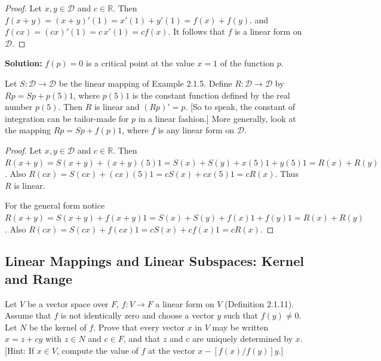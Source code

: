 \begin{proof}
    Let $x, y \in \mathcal{D}$ and $c \in \mathbb{R}$.
    Then $f(x + y) = (x + y)'(1) = x'(1) + y'(1) = f(x) + f(y)$.
    and $f(cx) = (cx)'(1) = c\, x'(1) = c f(x)$.
    It follows that $f$ is a linear form on $\mathcal{D}$.
\end{proof}

\textbf{Solution:} $f(p) = 0$ is a critical point at the value $x = 1$ of the function $p$.

\begin{tcolorbox}[title=Problem 8, breakable]
    Let $S : \mathcal{D} \longrightarrow \mathcal{D}$ be the linear mapping of Example 2.1.5.
    Define $R : \mathcal{D} \longrightarrow \mathcal{D}$ by $Rp = Sp + p(5)1$, where $p(5)1$ is the 
    constant function defined by the real number $p(5)$. Then $R$ is linear and 
    $(Rp)' = p$. [So to speak, the constant of integration can be tailor-made for $p$ in a linear fashion.]
    More generally, look at the mapping $Rp = Sp + f(p)1$, where $f$ is any linear form on $\mathcal{D}$.
\end{tcolorbox}

\begin{proof}
    Let $x, y \in \mathcal{D}$ and $c \in \mathbb{R}$.
    Then $R(x + y) = S(x + y) + (x + y)(5)1 = S(x) + S(y) + x(5)1 + y(5)1 = R(x) + R(y)$.
    Also $R(cx) = S(cx) + (cx)(5)1 = c S(x) + c x(5)1 = c R(x)$.
    Thus $R$ is linear.
    
    For the general form 
        notice $R(x + y) = S(x + y) + f(x + y)1 = S(x) + S(y) + f(x)1 + f(y)1 = R(x) + R(y)$.
    Also $R(c x) = S(c x) + f(c x)1 = c S(x) + c f(x)1 = c R(x)$.
\end{proof}

\subsection{Linear Mappings and Linear Subspaces: Kernel and Range}

\begin{tcolorbox}[title=Problem 2, breakable]
    Let $V$ be a vector space over $F$, $f : V \longrightarrow F$ a linear form on $V$ 
        (Definition 2.1.11). Assume that $f$ is not identically zero and choose a vector $y$ 
        such that $f(y) \ne 0$. 
    Let $N$ be the kernel of $f$. Prove that every vector $x$ in $V$ may be written $x = z + cy$
        with $z \in N$ and $c \in F$, and that $z$ and $c$ are uniquely determined by $x$.
    [Hint: If $x \in V$, compute the value of $f$ at the vector $x - [f(x)/f(y)]y$.]
\end{tcolorbox}

